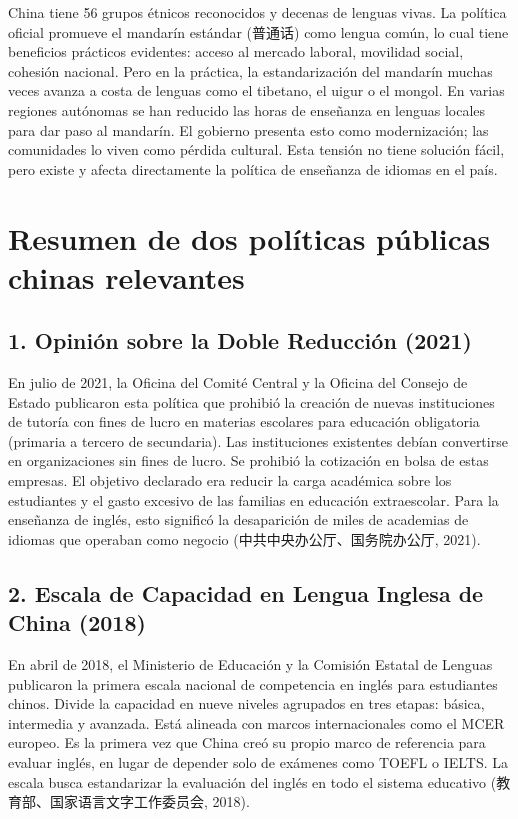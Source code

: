 \documentclass[12pt,a4paper]{article}
\newcommand{\zh}[1]{{\cjkfont #1}}
\begin{document}
China tiene 56 grupos étnicos reconocidos y decenas de lenguas vivas. La política oficial promueve el mandarín estándar (\zh{普通话}) como lengua común, lo cual tiene beneficios prácticos evidentes: acceso al mercado laboral, movilidad social, cohesión nacional. Pero en la práctica, la estandarización del mandarín muchas veces avanza a costa de lenguas como el tibetano, el uigur o el mongol. En varias regiones autónomas se han reducido las horas de enseñanza en lenguas locales para dar paso al mandarín. El gobierno presenta esto como modernización; las comunidades lo viven como pérdida cultural. Esta tensión no tiene solución fácil, pero existe y afecta directamente la política de enseñanza de idiomas en el país.

\section*{Resumen de dos políticas públicas chinas relevantes}

\subsection*{1. Opinión sobre la Doble Reducción (2021)}

En julio de 2021, la Oficina del Comité Central y la Oficina del Consejo de Estado publicaron esta política que prohibió la creación de nuevas instituciones de tutoría con fines de lucro en materias escolares para educación obligatoria (primaria a tercero de secundaria). Las instituciones existentes debían convertirse en organizaciones sin fines de lucro. Se prohibió la cotización en bolsa de estas empresas. El objetivo declarado era reducir la carga académica sobre los estudiantes y el gasto excesivo de las familias en educación extraescolar. Para la enseñanza de inglés, esto significó la desaparición de miles de academias de idiomas que operaban como negocio (\zh{中共中央办公厅、国务院办公厅}, 2021).

\subsection*{2. Escala de Capacidad en Lengua Inglesa de China (2018)}

En abril de 2018, el Ministerio de Educación y la Comisión Estatal de Lenguas publicaron la primera escala nacional de competencia en inglés para estudiantes chinos. Divide la capacidad en nueve niveles agrupados en tres etapas: básica, intermedia y avanzada. Está alineada con marcos internacionales como el MCER europeo. Es la primera vez que China creó su propio marco de referencia para evaluar inglés, en lugar de depender solo de exámenes como TOEFL o IELTS. La escala busca estandarizar la evaluación del inglés en todo el sistema educativo (\zh{教育部、国家语言文字工作委员会}, 2018).
\end{document}
